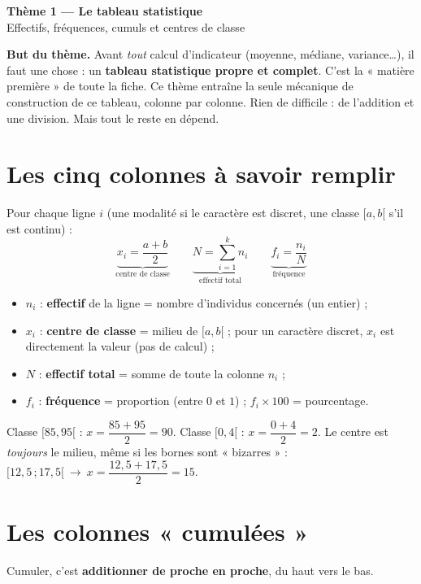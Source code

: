\documentclass[11pt,a4paper]{article}
\newcommand{\bandeau}[2]{%
\begin{tcolorbox}[boxbase,colback=primary,colframe=primarydark,halign=center,
   before skip=2pt,after skip=12pt]
{\LARGE\bfseries\color{white} #1}\\[3pt]{\normalsize\color{white} #2}
\end{tcolorbox}}
\begin{document}
\bandeau{Thème 1 — Le tableau statistique}{Effectifs, fréquences, cumuls et centres de classe}

\noindent\textbf{But du thème.} Avant \emph{tout} calcul d'indicateur (moyenne, médiane, variance\ldots),
il faut une chose : un \textbf{tableau statistique propre et complet}. C'est la « matière première »
de toute la fiche. Ce thème entraîne la seule mécanique de construction de ce tableau, colonne par
colonne. Rien de difficile : de l'addition et une division. Mais tout le reste en dépend.

\section{Les cinq colonnes à savoir remplir}

\begin{formule}
Pour chaque ligne $i$ (une modalité si le caractère est discret, une classe $[a,b[$ s'il est continu) :
\[
\underbrace{x_i=\frac{a+b}{2}}_{\text{centre de classe}}\qquad
\underbrace{N=\sum_{i=1}^{k} n_i}_{\text{effectif total}}\qquad
\underbrace{f_i=\frac{n_i}{N}}_{\text{fréquence}}
\]
\begin{itemize}
  \item $n_i$ : \textbf{effectif} de la ligne = nombre d'individus concernés (un entier) ;
  \item $x_i$ : \textbf{centre de classe} = milieu de $[a,b[$ ; pour un caractère discret, $x_i$ est
        directement la valeur (pas de calcul) ;
  \item $N$ : \textbf{effectif total} = somme de toute la colonne $n_i$ ;
  \item $f_i$ : \textbf{fréquence} = proportion (entre $0$ et $1$) ; $f_i\times 100$ = pourcentage.
\end{itemize}
\end{formule}

\begin{exemple}
Classe $[85,95[$ : $x=\dfrac{85+95}{2}=90$. \quad Classe $[0,4[$ : $x=\dfrac{0+4}{2}=2$.
Le centre est \emph{toujours} le milieu, même si les bornes sont « bizarres » :
$[12{,}5\,;17{,}5[\ \to\ x=\dfrac{12{,}5+17{,}5}{2}=15$.
\end{exemple}

\section{Les colonnes « cumulées »}

Cumuler, c'est \textbf{additionner de proche en proche}, du haut vers le bas.
\end{document}
